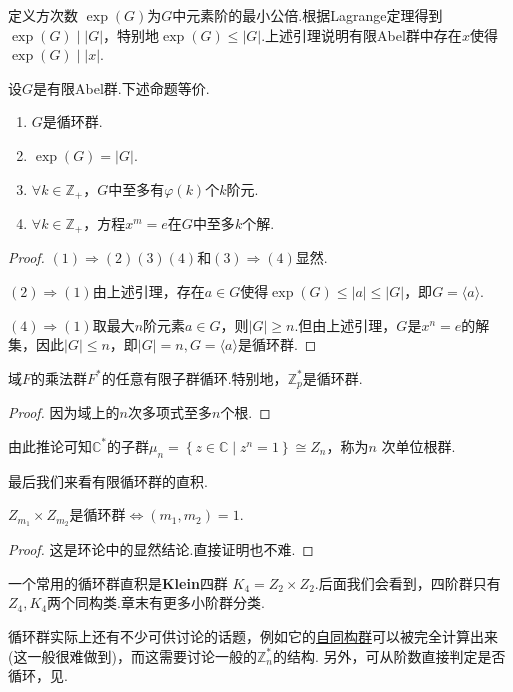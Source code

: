 定义{\heiti 方次数} $\exp(G)$为$G$中元素阶的最小公倍.根据Lagrange定理得到$\exp(G)\mid|G|$，特别地$\exp(G)\le |G|$.上述引理说明有限Abel群中存在$x$使得$\exp(G)\mid|x|$.
\begin{thm}
	设$G$是有限Abel群.下述命题等价.
	\begin{enumerate}
		\item $G$是循环群.
		\item $\exp(G)=|G|$.
		\item $\forall k\in\mathbb{Z}_+$，$G$中至多有$\varphi(k)$个$k$阶元.
		\item $\forall k\in\mathbb{Z}_+$，方程$x^m=e$在$G$中至多$k$个解.
	\end{enumerate}
\end{thm}
\begin{proof}
	\hspace*{5.4pt}$(1)\Rightarrow(2)(3)(4)$和$(3)\Rightarrow(4)$显然.

	$(2)\Rightarrow(1)$由上述引理，存在$a\in G$使得$\exp(G)\le|a|\le|G|$，即$G=\langle a\rangle $.

	$(4)\Rightarrow(1)$取最大$n$阶元素$a\in G$，则$|G|\ge n$.但由上述引理，$G$是$x^n=e$的解集，因此$|G|\le n$，即$|G|=n,G=\langle a\rangle $是循环群.
\end{proof}
\begin{cor}
	域$F$的乘法群$F^*$的任意有限子群循环.特别地，$\mathbb{Z}_p^*$是循环群.
\end{cor}
\begin{proof}
	因为域上的$n$次多项式至多$n$个根.
\end{proof}

由此推论可知$\mathbb{C}^*$的子群$\mu_n=\left\{z\in\mathbb{C}\mid z^n=1\right\}\cong Z_n$，称为$n$ {\heiti 次单位根群}.

最后我们来看有限循环群的直积.
\begin{prop}
	$Z_{m_1}\times Z_{m_2}$是循环群$\Leftrightarrow(m_1,m_2)=1$.
\end{prop}
\begin{proof}
	这是环论中的显然结论.直接证明也不难.
\end{proof}

一个常用的循环群直积是{\heiti \textbf{Klein}四群} $K_4=Z_2\times Z_2$.后面我们会看到，四阶群只有$Z_4,K_4$两个同构类.章末有更多小阶群分类.

\begin{remark}
	循环群实际上还有不少可供讨论的话题，例如它的\hyperlink{prop:CyclicAuto}{自同构群}可以被完全计算出来(这一般很难做到)，而这需要讨论一般的$\mathbb{Z}_n^*$的结构.
	另外，可从阶数直接判定是否循环，见.%
\end{remark}

